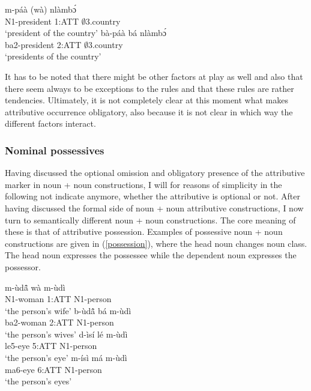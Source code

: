 \begin{exe}
\ex\label{country}
\begin{xlist}
\ex \label{country1}
  \gll     m-páà (wà) nlàmbɔ́ \\
               N1-president 1:ATT $\emptyset$3.country  \\
    \trans `president of the country'
\ex\label{country2}
 \gll     bà-páà bá nlàmbɔ́ \\
               ba2-president 2:ATT $\emptyset$3.country \\
    \trans `presidents of the country'
\end {xlist}
\end{exe}


It has to be noted that there might be other factors at play as well and also that there seem always  to be exceptions to the rules and that these rules are rather tendencies. Ultimately, it is not completely clear at this moment what makes attributive occurrence obligatory, also because it is not clear in which way the different factors interact. 

\subsubsection{Nominal possessives}  
\label{sec:NomPOSS}

Having discussed the optional omission and obligatory presence of the attributive marker in noun + noun constructions, I will for reasons of simplicity in the following not indicate anymore, whether the attributive is optional or not. After having discussed the formal side of noun + noun attributive constructions, I now turn to semantically different noun + noun constructions. The core meaning of these is that of attributive possession. Examples of possessive noun + noun constructions are given in (\ref{possession}), where the head noun changes noun class. The head noun expresses the possessee while the dependent noun expresses the possessor.

\begin{exe}
\ex\label{possession}
\begin{xlist}
\ex \label{possession1}
  \gll     m-ùdã̂ wà m-ùdì \\
               N1-woman 1:ATT N1-person  \\
    \trans `the person's wife'
\ex \label{possession2}
  \gll     b-ùdã̂ bá m-ùdì \\
               ba2-woman 2:ATT N1-person  \\
    \trans `the person's wives'
\ex \label{possession3}
  \gll     d-ìsí lé m-ùdì \\
               le5-eye 5:ATT N1-person  \\
    \trans `the person's eye'
\ex \label{possession4}
  \gll     m-ísì má m-ùdì \\
               ma6-eye 6:ATT N1-person  \\
    \trans `the person's eyes'
\end {xlist}
\end{exe}

